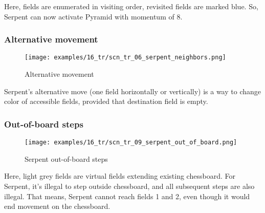 Here, fields are enumerated in visiting order, revisited fields are marked
blue. So, Serpent can now activate Pyramid with momentum of 8.

\clearpage %

\subsubsection*{Alternative movement}

\noindent
\begin{wrapfigure}[5]{l}{0.4\textwidth}
\centering
\texttt{[image: examples/16\_tr/scn\_tr\_06\_serpent\_neighbors.png]}
\caption{Alternative movement}
\label{fig:scn_tr_06_serpent_neighbors}
\end{wrapfigure}
Serpent's alternative move (one field horizontally or vertically) is a way to
change color of accessible fields, provided that destination field is empty.

\clearpage %

\subsubsection*{Out-of-board steps}

\vspace*{-1.0\baselineskip}
\noindent
\begin{figure}[!h]
\texttt{[image: examples/16\_tr/scn\_tr\_09\_serpent\_out\_of\_board.png]}
\caption{Serpent out-of-board steps}
\label{fig:scn_tr_09_serpent_out_of_board}
\end{figure}

Here, light grey fields are virtual fields extending existing chessboard.
For Serpent, it's illegal to step outside chessboard, and all subsequent
steps are also illegal. That means, Serpent cannot reach fields 1 and 2,
even though it would end movement on the chessboard.

\clearpage %

